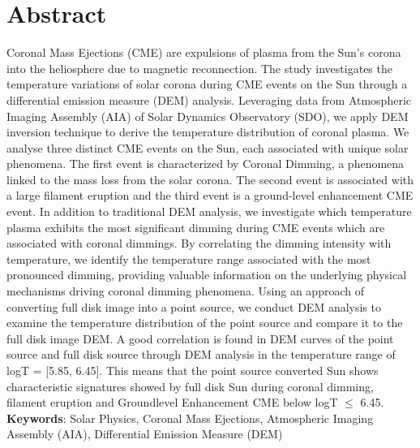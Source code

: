 
\setcounter{page}{1}
\section{Abstract}



Coronal Mass Ejections (CME) are expulsions of plasma from the Sun's corona into the heliosphere due to magnetic reconnection. The study investigates the temperature variations of solar corona during CME events on the Sun through a differential emission measure (DEM) analysis. Leveraging data from Atmospheric Imaging Assembly (AIA) of Solar Dynamics Observatory (SDO), we apply DEM inversion technique to derive the temperature distribution of coronal plasma. We analyse three distinct CME events on the Sun, each associated with unique solar phenomena. The first event is characterized by Coronal Dimming, a phenomena linked to the mass loss from the solar corona. The second event is associated with a large filament eruption and the third event is a ground-level enhancement CME event. In addition to traditional DEM analysis, we investigate which temperature plasma exhibits the most significant dimming during CME events which are associated with coronal dimmings. By correlating the dimming intensity with temperature, we identify the temperature range associated with the most pronounced dimming, providing valuable information on the underlying physical mechanisms driving coronal dimming phenomena. Using an approach of converting full disk image into a point source, we conduct DEM analysis to examine the temperature distribution of the point source and compare it to the full disk image DEM. A good correlation is found in DEM curves of the point source and full disk source through DEM analysis in the temperature range of logT = [5.85, 6.45]. This means that the point source converted Sun shows characteristic signatures showed by full disk Sun during coronal dimming, filament eruption and Groundlevel Enhancement CME below logT $\le$ 6.45.\\

\noindent
\textbf{Keywords}: Solar Physics, Coronal Mass Ejections, Atmospheric Imaging Assembly (AIA), Differential Emission Measure (DEM)


